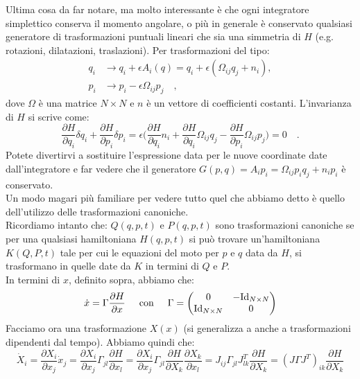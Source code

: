 \documentclass[10pt,a4paper]{article}
\begin{document}
Ultima cosa da far notare, ma molto interessante è che ogni integratore simplettico conserva il momento angolare, o più in generale è conservato qualsiasi generatore di trasformazioni puntuali lineari che sia una simmetria di $H$ (e.g. rotazioni, dilatazioni, traslazioni). Per trasformazioni del tipo:
\begin{align}
q_i & \to q_i + \epsilon A_i(q) = q_i + \epsilon(\Omega_{ij}q_j + n_i) , \\
p_i & \to p_i - \epsilon \Omega_{ij}p_j \quad,
\end{align}
dove $\Omega$ è una matrice $N \times N$ e $n$ è un vettore di coefficienti costanti. L'invarianza di $H$ si scrive come:
\begin{equation}
\frac{\partial H}{\partial q_i} \delta q_i + \frac{\partial H}{\partial p_i} \delta p_i = \epsilon \Bigg( \frac{\partial H}{\partial q_i} n_i + \frac{\partial H}{\partial q_i} \Omega_{ij}q_j - \frac{\partial H}{\partial p_i} \Omega_{ij}p_j \Bigg) = 0 \quad.
\end{equation}
Potete divertirvi a sostituire l'espressione data per le nuove coordinate date dall'integratore e far vedere che il generatore $G(p, q) = A_i p_i = \Omega_{ij} p_i q_j + n_i p_i$ è conservato.\\ Un modo magari più familiare per vedere tutto quel che abbiamo detto è quello dell'utilizzo delle trasformazioni canoniche.\\ Ricordiamo intanto che: $Q(q, p, t)$ e $P(q, p, t)$ sono trasformazioni canoniche se per una qualsiasi hamiltoniana  $H(q, p, t)$ si può trovare un'hamiltoniana $K(Q, P, t)$ tale per cui le equazioni del moto per $p$ e $q$ data da $H$, si trasformano in quelle date da $K$ in termini di $Q$ e $P$.\\
In termini di $x$, definito sopra, abbiamo che:
\begin{equation}
\dot{x} = \Gamma \frac{\partial H}{\partial x} \hspace{5 mm } \text{con} \hspace{5 mm} \Gamma = 
\begin{pmatrix}
0 & - \text{Id}_{N \times N} \\
\text{Id}_{N \times N} & 0 \\
\end{pmatrix}
\end{equation}
Facciamo ora una trasformazione $X(x)$ (si generalizza a anche a trasformazioni dipendenti dal tempo). Abbiamo quindi che:
\begin{equation}
\dot{X}_i = \frac{\partial X_i}{\partial x_j} \dot{x}_j = \frac{\partial X_i}{\partial x_j} \Gamma_{jl} \frac{\partial H}{\partial x_l} = \frac{\partial X_i}{\partial x_j} \Gamma_{jl} \frac{\partial H}{\partial X_k} \frac{\partial X_k}{\partial x_l}  =  J_{ij}\Gamma_{jl}J^T_{lk} \frac{\partial H}{\partial X_k} = (J \Gamma J^T)_{ik} \frac{\partial H}{\partial X_k}
\end{equation}
\end{document}
